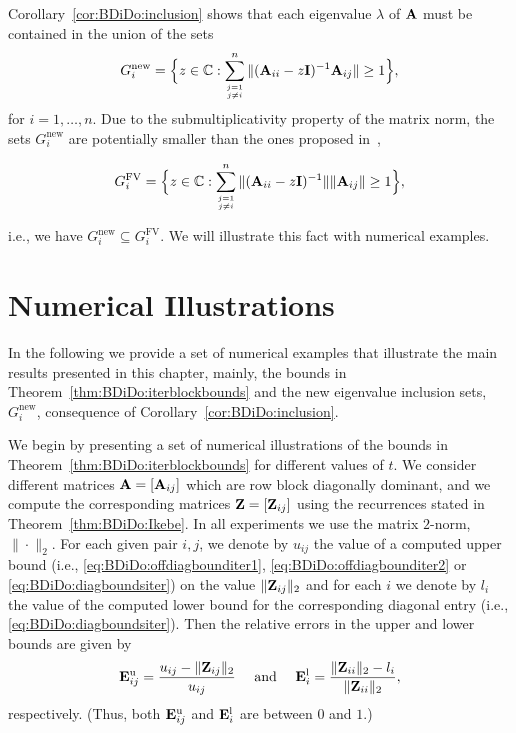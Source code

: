 Corollary~\ref{cor:BDiDo:inclusion} shows that each eigenvalue $\lambda$ of
$\mathbf{A}$ must be contained in the union of the sets
%
\[
G_i^{\text{new}}=\Big\{z\in\mathbb{C} : \sum_{\atopfrac{j=1}{j\neq i}}^{n} \| (\A_{ii}-z \I)^{-1} \A_{ij}\|\geq 1\Big\},
\]
%
%
for $i=1,\dots,n$. Due to the submultiplicativity property of the matrix norm,
the sets $G_i^{\text{new}}$ are potentially smaller than the ones proposed
in~\cite[Definition~3]{FeiVar62},
%
\begin{small}\[
G_i^{\text{FV}}=\Big\{z\in\mathbb{C} : \sum_{\atopfrac{j=1}{j\neq i}}^{n} \| (\A_{ii}-z \I)^{-1}\| \|\A_{ij}\|\geq 1\Big\},
\]\end{small}
%
i.e., we have $G_i^{\text{new}}\subseteq G_i^{\text{FV}}$. We will illustrate
this fact with numerical examples.


\section{Numerical Illustrations}
\label{BDiDo:numerics}
In the following we provide a set of numerical examples that illustrate the
main results presented in this chapter, mainly, the bounds in
Theorem~\ref{thm:BDiDo:iterblockbounds} and the new eigenvalue inclusion sets,
$G_i^{\text{new}}$, consequence of Corollary~\ref{cor:BDiDo:inclusion}.

We begin by presenting a set of numerical illustrations of the bounds in
Theorem~\ref{thm:BDiDo:iterblockbounds} for different values of $t$. We
consider different matrices $\mathbf{A}=[\mathbf{A}_{ij}]$ which are row block diagonally
dominant, and we compute the corresponding {matrices} $\mathbf{Z}=[\mathbf{Z}_{ij}]$ using the
recurrences stated in Theorem~\ref{thm:BDiDo:Ikebe}. In all experiments we use
the matrix $2$-norm, $\|\cdot\|_2$. For each given pair $i,j$, we denote by
$u_{ij}$ the value of a computed upper bound (i.e.,
\eqref{eq:BDiDo:offdiagbounditer1}, \eqref{eq:BDiDo:offdiagbounditer2} or
\eqref{eq:BDiDo:diagboundsiter}) on the value $\|\mathbf{Z}_{ij}\|_2$ and for each $i$
we denote by $l_i$ the value of the computed lower bound for the corresponding
diagonal entry (i.e., \eqref{eq:BDiDo:diagboundsiter}). Then the relative
errors in the upper and lower bounds are given by
%
\begin{equation}\label{eq:BDiDo:RelErr}
\mathbf{E}^{\text{u}}_{ij}=\frac{u_{ij}-\|\mathbf{Z}_{ij}\|_2}{u_{ij}}\quad\text{ and }\quad \mathbf{E}^{\text{l}}_{i}=\frac{\|\mathbf{Z}_{ii}\|_2-l_{i}}{\|\mathbf{Z}_{ii}\|_2},
\end{equation}
%
respectively. (Thus, both $\mathbf{E}^{\text{u}}_{ij}$ and $\mathbf{E}^{\text{l}}_{i}$ are
between $0$ and $1$.)

